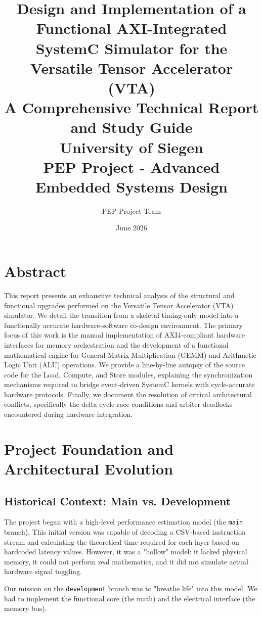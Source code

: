 \documentclass[11pt,a4paper]{report}
\title{
    \Huge \textbf{Design and Implementation of a Functional AXI-Integrated SystemC Simulator for the Versatile Tensor Accelerator (VTA)}\\
    \vspace{1.5cm}
    \Large \textbf{A Comprehensive Technical Report and Study Guide}\\
    \vspace{1cm}
    \large University of Siegen\\
    PEP Project - Advanced Embedded Systems Design
}
\author{PEP Project Team}
\date{June 2026}
\begin{document}
\maketitle

\chapter*{Abstract}
This report presents an exhaustive technical analysis of the structural and functional upgrades performed on the Versatile Tensor Accelerator (VTA) simulator. We detail the transition from a skeletal timing-only model into a functionally accurate hardware-software co-design environment. The primary focus of this work is the manual implementation of AXI4-compliant hardware interfaces for memory orchestration and the development of a functional mathematical engine for General Matrix Multiplication (GEMM) and Arithmetic Logic Unit (ALU) operations. We provide a line-by-line autopsy of the source code for the Load, Compute, and Store modules, explaining the synchronization mechanisms required to bridge event-driven SystemC kernels with cycle-accurate hardware protocols. Finally, we document the resolution of critical architectural conflicts, specifically the delta-cycle race conditions and arbiter deadlocks encountered during hardware integration.

\tableofcontents
\newpage

\chapter{Project Foundation and Architectural Evolution}

\section{Historical Context: Main vs. Development}
The project began with a high-level performance estimation model (the \texttt{main} branch). This initial version was capable of decoding a CSV-based instruction stream and calculating the theoretical time required for each layer based on hardcoded latency values. However, it was a "hollow" model: it lacked physical memory, it could not perform real mathematics, and it did not simulate actual hardware signal toggling.

Our mission on the \texttt{development} branch was to "breathe life" into this model. We had to implement the functional core (the math) and the electrical interface (the memory bus).
\end{document}
